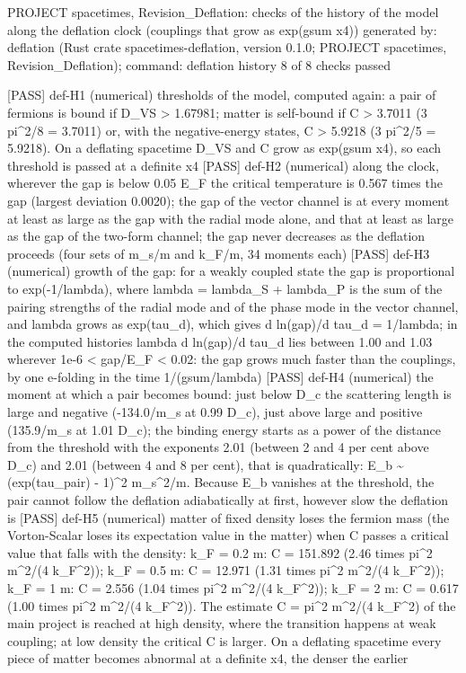 \documentclass[
  10pt,
]{article}
\newenvironment{Shaded}{}{}
\newcommand{\NormalTok}[1]{#1}
\begin{document}
\begin{Shaded}
\begin{Highlighting}[]
\NormalTok{PROJECT spacetimes, Revision\_Deflation: checks of the history of the model along the deflation clock (couplings that grow as exp(gsum x4))}
\NormalTok{generated by: deflation (Rust crate spacetimes{-}deflation, version 0.1.0; PROJECT spacetimes, Revision\_Deflation); command: deflation history}
\NormalTok{8 of 8 checks passed}

\NormalTok{[PASS] def{-}H1  (numerical) thresholds of the model, computed again: a pair of fermions is bound if D\_VS \textgreater{} 1.67981; matter is self{-}bound if C \textgreater{} 3.7011 (3 pi\^{}2/8 = 3.7011) or, with the negative{-}energy states, C \textgreater{} 5.9218 (3 pi\^{}2/5 = 5.9218). On a deflating spacetime D\_VS and C grow as exp(gsum x4), so each threshold is passed at a definite x4}
\NormalTok{[PASS] def{-}H2  (numerical) along the clock, wherever the gap is below 0.05 E\_F the critical temperature is 0.567 times the gap (largest deviation 0.0020); the gap of the vector channel is at every moment at least as large as the gap with the radial mode alone, and that at least as large as the gap of the two{-}form channel; the gap never decreases as the deflation proceeds (four sets of m\_s/m and k\_F/m, 34 moments each)}
\NormalTok{[PASS] def{-}H3  (numerical) growth of the gap: for a weakly coupled state the gap is proportional to exp({-}1/lambda), where lambda = lambda\_S + lambda\_P is the sum of the pairing strengths of the radial mode and of the phase mode in the vector channel, and lambda grows as exp(tau\_d), which gives d ln(gap)/d tau\_d = 1/lambda; in the computed histories lambda d ln(gap)/d tau\_d lies between 1.00 and 1.03 wherever 1e{-}6 \textless{} gap/E\_F \textless{} 0.02: the gap grows much faster than the couplings, by one e{-}folding in the time 1/(gsum/lambda)}
\NormalTok{[PASS] def{-}H4  (numerical) the moment at which a pair becomes bound: just below D\_c the scattering length is large and negative ({-}134.0/m\_s at 0.99 D\_c), just above large and positive (135.9/m\_s at 1.01 D\_c); the binding energy starts as a power of the distance from the threshold with the exponents 2.01 (between 2 and 4 per cent above D\_c) and 2.01 (between 4 and 8 per cent), that is quadratically: E\_b \textasciitilde{} (exp(tau\_pair) {-} 1)\^{}2 m\_s\^{}2/m. Because E\_b vanishes at the threshold, the pair cannot follow the deflation adiabatically at first, however slow the deflation is}
\NormalTok{[PASS] def{-}H5  (numerical) matter of fixed density loses the fermion mass (the Vorton{-}Scalar loses its expectation value in the matter) when C passes a critical value that falls with the density: k\_F = 0.2 m: C = 151.892 (2.46 times pi\^{}2 m\^{}2/(4 k\_F\^{}2)); k\_F = 0.5 m: C = 12.971 (1.31 times pi\^{}2 m\^{}2/(4 k\_F\^{}2)); k\_F = 1 m: C = 2.556 (1.04 times pi\^{}2 m\^{}2/(4 k\_F\^{}2)); k\_F = 2 m: C = 0.617 (1.00 times pi\^{}2 m\^{}2/(4 k\_F\^{}2)). The estimate C = pi\^{}2 m\^{}2/(4 k\_F\^{}2) of the main project is reached at high density, where the transition happens at weak coupling; at low density the critical C is larger. On a deflating spacetime every piece of matter becomes abnormal at a definite x4, the denser the earlier}

\end{Highlighting}
\end{Shaded}
\end{document}
